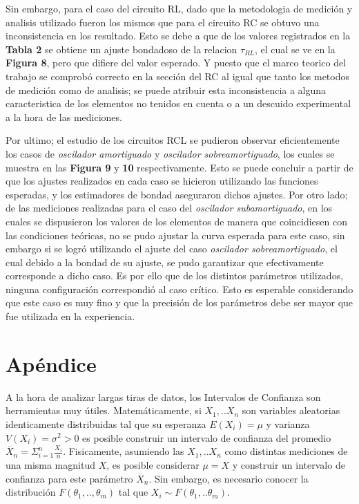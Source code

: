 \documentclass[11pt,a4paper]{article}
\begin{document}
Sin embargo, para el caso del circuito RL, dado que la metodologia de medición y analisis utilizado fueron los mismos que para el circuito RC se obtuvo una inconsistencia en los resultado. Esto se debe a que de los valores registrados en la \textbf{Tabla 2} se obtiene un ajuste bondadoso de la relacion $\tau_{RL}$, el cual se ve en la \textbf{Figura 8}, pero que difiere del valor esperado. Y puesto que el marco teorico del trabajo se comprobó correcto en la sección del RC al igual que tanto los metodos de medición como de analisis; se puede atribuir esta inconsistencia a alguna caracteristica de los elementos no tenidos en cuenta o a un descuido experimental a la hora de las mediciones.

Por ultimo; el estudio de los circuitos RCL se pudieron observar eficientemente los casos de \textit{oscilador amortiguado} y \textit{oscilador sobreamortiguado}, los cuales se muestra en las \textbf{Figura 9} y \textbf{10} respectivamente. Esto se puede concluir a partir de que los ajustes realizados en cada caso se hicieron utilizando las funciones esperadas, y los estimadores de bondad aseguraron dichos ajustes. Por otro lado; de las mediciones realizadas para el caso del \textit{oscilador subamortiguado}, en los cuales se dispusieron los valores de los elementos de manera que coincidiesen con las condiciones teóricas, no se pudo ajustar la curva esperada para este caso, sin embargo si se logró utilizando el ajuste del caso \textit{oscilador sobreamortiguado}, el cual debido a la bondad de su ajuste, se pudo garantizar que efectivamente corresponde a dicho caso. Es por ello que de los distintos parámetros utilizados, ninguna configuración correspondió al caso crítico. Esto es esperable considerando que este caso es muy fino y que la precisión de los parámetros debe ser mayor que fue utilizada en la experiencia.



\section{Apéndice}
\label{sec:apendice}

A la hora de analizar largas tiras de datos, los Intervalos de Confianza son herramientas muy útiles. Matemáticamente, si $X_1,..X_n$ son variables aleatorias identicamente distribuidas tal que su esperanza $E(X_i) = \mu$ y varianza $V(X_i) = \sigma^2 > 0$ es posible construir un intervalo de confianza del promedio $\overline{X}_n = \Sigma_{i=1}^{n} \frac{X_i}{n}$. Fisicamente, asumiendo las $X_1,..X_n$ como distintas mediciones de una misma magnitud $X$, es posible considerar $\mu = X$ y construir un intervalo de confianza para este parámetro $\overline{X}_n$. Sin embargo, es necesario conocer la distribución $F(\theta_1,..,\theta_m)$ tal que $X_i \sim F(\theta_1,..\theta_m)$. 
\end{document}
